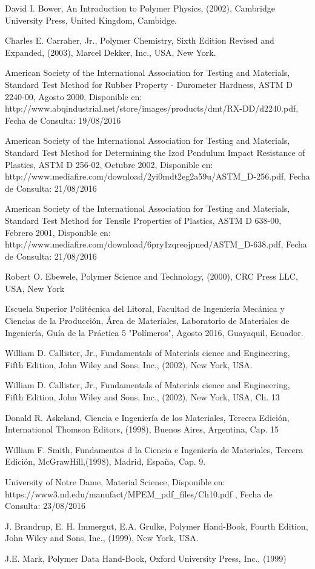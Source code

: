 \documentclass[a4paper, 11pt]{article}
\begin{document}
\begin{thebibliography}{9}

David I. Bower, An Introduction to Polymer Physics, (2002), Cambridge University Press,  United Kingdom, Cambidge.

Charles E. Carraher, Jr., Polymer Chemistry, Sixth Edition Revised and Expanded, (2003), Marcel Dekker, Inc., USA, New York.  

American Society of the International Association for Testing and Materials, Standard Test Method for Rubber Property - Durometer Hardness, ASTM D 2240-00, Agosto 2000, Disponible en: http://www.abqindustrial.net/store/images/products/dmt/RX-DD/d2240.pdf, Fecha de Consulta: 19/08/2016 

American Society of the International Association for Testing and Materials, Standard Test Method for Determining the Izod Pendulum Impact Resistance of Plastics, ASTM D 256-02, Octubre 2002, Disponible en: http://www.mediafire.com/download/2yi0mdt2eg2a59u/ASTM\_D-256.pdf, Fecha de Consulta: 21/08/2016 

American Society of the International Association for Testing and Materials, Standard Test Method for Tensile Properties of Plastics, ASTM D 638-00, Febrero 2001, Disponible en: http://www.mediafire.com/download/6pry1zqreojpned/ASTM\_D-638.pdf, Fecha de Consulta: 21/08/2016 

Robert O. Ebewele, Polymer Science and Technology, (2000), CRC Press LLC, USA, New York

Escuela Superior Politécnica del Litoral, Facultad de Ingeniería Mecánica y Ciencias de la Producción, Área de Materiales, Laboratorio de Materiales de Ingeniería, Guía de la Práctica 5 "Polímeros", Agosto 2016, Guayaquil, Ecuador.

William D. Callister, Jr., Fundamentals of Materials cience and Engineering, Fifth Edition, John Wiley and Sons, Inc., (2002), New York, USA.  

William D. Callister, Jr., Fundamentals of Materials cience and Engineering, Fifth Edition, John Wiley and Sons, Inc., (2002), New York, USA, Ch. 13

Donald R. Askeland, Ciencia e Ingeniería de los Materiales, Tercera Edición, International Thomson Editors, (1998), Buenos Aires, Argentina, Cap. 15

William F. Smith, Fundamentos d la Ciencia e Ingeniería de Materiales, Tercera Edición, McGrawHill,(1998), Madrid, España, Cap. 9.

University of Notre Dame, Material Science, Disponible en: https://www3.nd.edu/manufact/MPEM\_pdf\_files/Ch10.pdf , Fecha de Consulta: 23/08/2016

J. Brandrup, E. H. Immergut, E.A. Grulke, Polymer Hand-Book, Fourth Edition, John Wiley and Sons, Inc., (1999), New York, USA.

J.E. Mark, Polymer Data Hand-Book, Oxford University Press, Inc., (1999)



\end{thebibliography}
\end{document}
